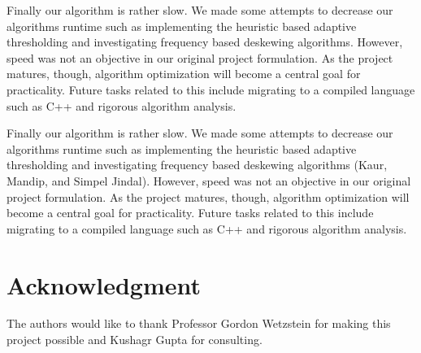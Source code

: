 \documentclass[journal]{IEEEtran}
\begin{document}
Finally our algorithm is rather slow. We made some attempts to decrease our algorithms runtime such as implementing the heuristic based adaptive thresholding and investigating frequency based deskewing algorithms\cite{Kaur:article_typical}. However, speed was not an objective in our original project formulation. As the project matures, though, algorithm optimization will become a central goal for practicality. Future tasks related to this include migrating to a compiled language such as C++ and rigorous algorithm analysis.

Finally our algorithm is rather slow. We made some attempts to decrease our algorithms runtime such as implementing the heuristic based adaptive thresholding and investigating frequency based deskewing algorithms (Kaur, Mandip, and Simpel Jindal). However, speed was not an objective in our original project formulation. As the project matures, though, algorithm optimization will become a central goal for practicality. Future tasks related to this include migrating to a compiled language such as C++ and rigorous algorithm analysis.




\section*{Acknowledgment}


The authors would like to thank Professor Gordon Wetzstein for making this project possible and Kushagr Gupta for consulting.





%
%
%




\end{document}
